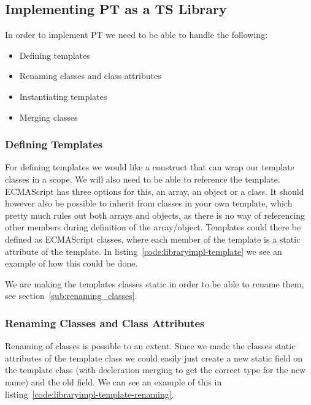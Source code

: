 
\subsection{Implementing PT as a TS Library}\label{subsec:implementing-pt-as-a-ts-library}

In order to implement PT we need to be able to handle the following:

\begin{itemize}
    \item Defining templates
    \item Renaming classes and class attributes
    \item Instantiating templates
    \item Merging classes
\end{itemize}

\subsubsection{Defining Templates}\label{subsubsec:defining-templates}

For defining templates we would like a construct that can wrap our template classes in a scope.
We will also need to be able to reference the template.
ECMAScript has three options for this, an array, an object or a class.
It should however also be possible to inherit from classes in your own template, which pretty much rules out both arrays and objects, as there is no way of referencing other members during definition of the array/object.
Templates could there be defined as ECMAScript classes, where each member of the template is a static attribute of the template.
In listing~\vref{code:libraryimpl-template} we see an example of how this could be done.

We are making the templates classes static in order to be able to rename them, see section~\vref{sub:renaming_classes}.


\subsubsection{Renaming Classes and Class Attributes}\label{subsubsec:renaming-classes-and-class-attributes}

Renaming of classes is possible to an extent.
Since we made the classes static attributes of the template class we could easily just create a new static field on the template class (with decleration merging to get the correct type for the new name) and \cite{deleteop} the old field.
We can see an example of this in listing~\vref{code:libraryimpl-template-renaming}.


